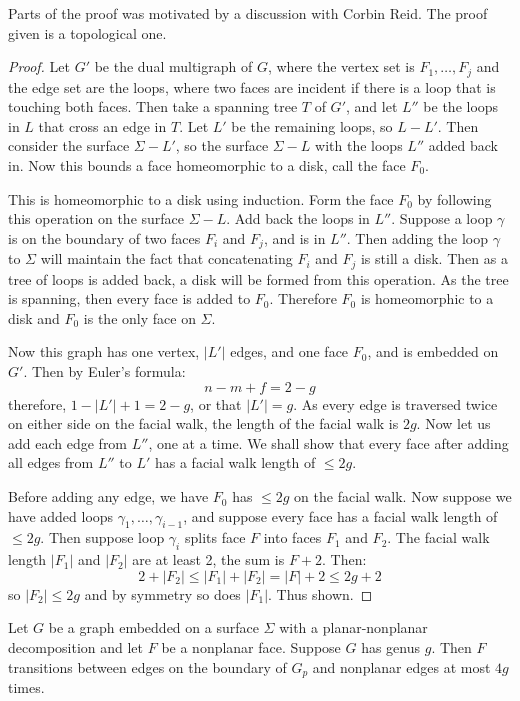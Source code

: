 Parts of the proof was motivated by a discussion with Corbin Reid. The proof given is a topological one.

\begin{proof}
	Let \(G'\) be the dual multigraph of $G$, where the vertex set is \(F_1, \ldots, F_j\) and the edge set are the loops, where two faces are incident if there is a loop that is touching both faces. Then take a spanning tree \(T\) of \(G'\), and let \(L''\) be the loops in $L$ that cross an edge in \(T\). Let $L'$ be the remaining loops, so $L - L'$. 
	Then consider the surface \(\Sigma - L'\), so the surface $\Sigma - L$ with the loops $L''$ added back in. Now this bounds a face homeomorphic to a disk, call the face \(F_0\). 
	
	This is homeomorphic to a disk using induction. Form the face $F_0$ by following this operation on the surface $\Sigma - L$. Add back the loops in $L''$. Suppose a loop $\gamma$ is on the boundary of two faces $F_i$ and $F_j$, and is in $L''$. Then adding the loop $\gamma$ to $\Sigma$ will maintain the fact that concatenating $F_i$ and $F_j$ is still a disk. Then as a tree of loops is added back, a disk will be formed from this operation. As the tree is spanning, then every face is added to $F_0$. Therefore $F_0$ is homeomorphic to a disk and $F_0$ is the only face on $\Sigma$. 

	Now this graph has one vertex, \(|L'|\) edges, and one face \(F_0\), and is embedded on $G'$. Then by Euler's formula:
	\begin{equation}
		n - m + f = 2 - g
	\end{equation}
	therefore, \(1 - |L'| + 1 = 2 - g\), or that \(|L'| = g\). As every edge is traversed twice on either side on the facial walk, the length of the facial walk is \(2g\).
	Now let us add each edge from \(L''\), one at a time. We shall show that every face after adding all edges from \(L''\) to \(L'\) has a facial walk length of \(\leq 2g\).

	Before adding any edge, we have \(F_0\) has \(\leq 2g\) on the facial walk. Now suppose we have added loops \(\gamma_1, \ldots, \gamma_{i - 1}\), and suppose every face has a facial walk length of \(\leq 2g\).
	Then suppose loop \(\gamma_i\) splits face \(F\) into faces \(F_1\) and \(F_2\). The facial walk length \(|F_1|\) and \(|F_2|\) are at least 2, the sum is \(F + 2\). Then:
	\begin{equation}
		2 + |F_2| \leq |F_1| + |F_2| = |F| + 2 \leq 2g + 2
	\end{equation}
	so \(|F_2| \leq 2g\) and by symmetry so does \(|F_1|\). Thus shown.
\end{proof}
\begin{corollary}\label{corr:orientable_nonplanar_faces}
	Let \(G\) be a graph embedded on a surface \(\Sigma\) with a planar-nonplanar decomposition and let \(F\) be a nonplanar face. Suppose \(G\) has genus \(g\). Then \(F\) transitions between edges on the boundary of $G_p$ and nonplanar edges at most $4g$ times.
\end{corollary}

